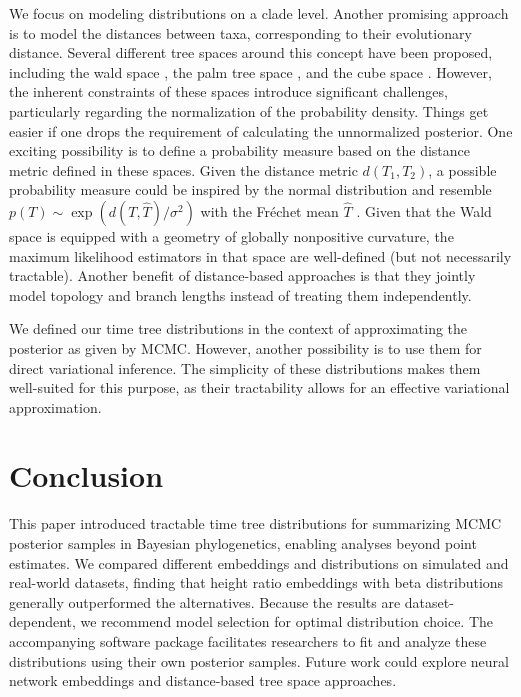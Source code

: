 \documentclass[10pt,letterpaper]{article}
\begin{document}
We focus on modeling distributions on a clade level. Another promising approach is to model the distances between taxa, corresponding to their evolutionary distance. Several different tree spaces around this concept have been proposed, including the wald space \cite{wald}, the palm tree space \cite{tropical}, and the cube space \cite{cube}. However, the inherent constraints of these spaces introduce significant challenges, particularly regarding the normalization of the probability density. Things get easier if one drops the requirement of calculating the unnormalized posterior. One exciting possibility is to define a probability measure based on the distance metric defined in these spaces. Given the distance metric $d(T_1, T_2)$, a possible probability measure could be inspired by the normal distribution and resemble $p(T) \sim \exp\left(d(T, \hat{T}) / \sigma^2\right)$ with the Fréchet mean $\hat{T}$ \cite{frechetmeanvar}. Given that the Wald space is equipped with a geometry of globally nonpositive curvature, the maximum likelihood estimators in that space are well-defined \cite{gaussianriemann} (but not necessarily tractable). Another benefit of distance-based approaches is that they jointly model topology and branch lengths instead of treating them independently.

We defined our time tree distributions in the context of approximating the posterior as given by MCMC. However, another possibility is to use them for direct variational inference. The simplicity of these distributions makes them well-suited for this purpose, as their tractability allows for an effective variational approximation.

\section*{Conclusion}

This paper introduced tractable time tree distributions for summarizing MCMC posterior samples in Bayesian phylogenetics, enabling analyses beyond point estimates. We compared different embeddings and distributions on simulated and real-world datasets, finding that height ratio embeddings with beta distributions generally outperformed the alternatives. Because the results are dataset-dependent, we recommend model selection for optimal distribution choice. The accompanying software package facilitates researchers to fit and analyze these distributions using their own posterior samples. Future work could explore neural network embeddings and distance-based tree space approaches.
\end{document}
